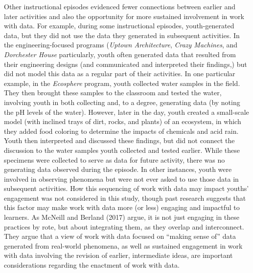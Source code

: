 \documentclass[]{book}
\theoremstyle{definition}
\theoremstyle{definition}
\theoremstyle{definition}
\theoremstyle{remark}
\begin{document}
Other instructional episodes evidenced fewer connections between earlier
and later activities and also the opportunity for more sustained
involvement in work with data. For example, during some instructional
episodes, youth-generated data, but they did not use the data they
generated in subsequent activities. In the engineering-focused programs
(\emph{Uptown Architecture}, \emph{Crazy Machines}, and \emph{Dorchester
House} particularly, youth often generated data that resulted from their
engineering designs (and communicated and interpreted their findings,)
but did not model this data as a regular part of their activities. In
one particular example, in the \emph{Ecosphere} program, youth collected
water samples in the field. They then brought these samples to the
classroom and tested the water, involving youth in both collecting and,
to a degree, generating data (by noting the pH levels of the water).
However, later in the day, youth created a small-scale model (with
inclined trays of dirt, rocks, and plants) of an ecosystem, in which
they added food coloring to determine the impacts of chemicals and acid
rain. Youth then interpreted and discussed these findings, but did not
connect the discussion to the water samples youth collected and tested
earlier. While these specimens were collected to serve as data for
future activity, there was no generating data observed during the
episode. In other instances, youth were involved in observing phenomena
but were not ever asked to use those data in subsequent activities. How
this sequencing of work with data may impact youths' engagement was not
considered in this study, though past research suggests that this factor
may make work with data more (or less) engaging and impactful to
learners. As McNeill and Berland (2017) argue, it is not just engaging
in these practices by rote, but about integrating them, as they overlap
and interconnect. They argue that a view of work with data focused on
``making sense of'' data generated from real-world phenomena, as well as
sustained engagement in work with data involving the revision of
earlier, intermediate ideas, are important considerations regarding the
enactment of work with data.
\end{document}
